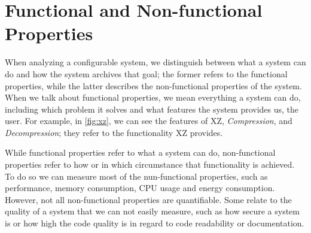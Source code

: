 \section{Functional and Non-functional Properties}\label{ch:properties}

When analyzing a configurable system, we distinguish between what a system can do and how the system archives that goal;
the former refers to the functional properties, while the latter describes the non-functional properties of the system\cite{non-functional-Properties}.
When we talk about functional properties, we mean everything a system can do, including which problem it solves and what features the system provides us, 
the user.
For example, in \autoref{fig:xz}, we can see the features of \textsc{XZ}, \textit{Compression}, 
and \textit{Decompression}; they refer to the functionality \textsc{XZ} provides.

While functional properties refer to what a system can do, non-functional properties refer to how or in which circumstance
that functionality is achieved\cite{non-functional-Properties}. 
To do so we can measure most of the nun-functional properties, such as performance, memory consumption, CPU usage and energy consumption. 
However, not all non-functional properties are quantifiable. Some relate to the quality of a system that we can not easily measure, such as
how secure a system is or how high the code quality is in regard to code readability or documentation\cite{non-functional-Properties}.
